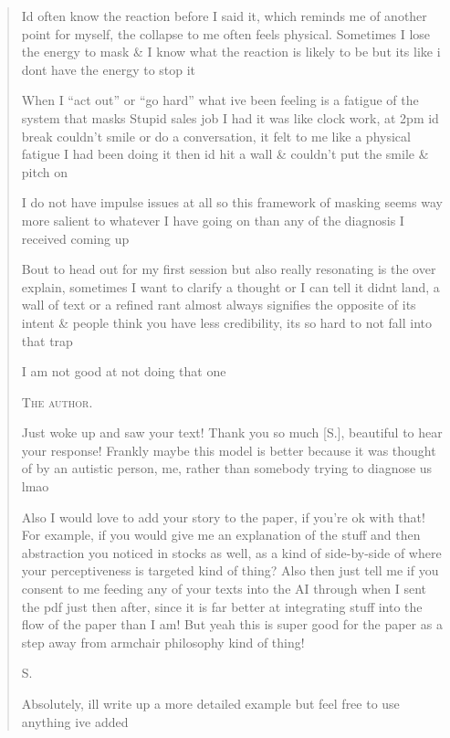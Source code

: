 \begin{quote}
\par\smallskip\noindent Id often know the reaction before I said it, which reminds me of another point for myself, the collapse to me often feels physical. Sometimes I lose the energy to mask \& I know what the reaction is likely to be but its like i dont have the energy to stop it
\par\smallskip\noindent When I ``act out'' or ``go hard'' what ive been feeling is a fatigue of the system that masks Stupid sales job I had it was like clock work, at 2pm id break couldn't smile or do a conversation, it felt to me like a physical fatigue I had been doing it then id hit a wall \& couldn't put the smile \& pitch on
\par\smallskip\noindent I do not have impulse issues at all so this framework of masking seems way more salient to whatever I have going on than any of the diagnosis I received coming up
\par\smallskip\noindent Bout to head out for my first session but also really resonating is the over explain, sometimes I want to clarify a thought or I can tell it didnt land, a wall of text or a refined rant almost always signifies the opposite of its intent \& people think you have less credibility, its so hard to not fall into that trap
\par\smallskip\noindent I am not good at not doing that one
\par\medskip\noindent\textsc{The author.}
\par\smallskip\noindent Just woke up and saw your text! Thank you so much [S.], beautiful to hear your response! Frankly maybe this model is better because it was thought of by an autistic person, me, rather than somebody trying to diagnose us lmao
\par\smallskip\noindent Also I would love to add your story to the paper, if you’re ok with that! For example, if you would give me an explanation of the stuff and then abstraction you noticed in stocks as well, as a kind of side-by-side of where your perceptiveness is targeted kind of thing? Also then just tell me if you consent to me feeding any of your texts into the AI through when I sent the pdf just then after, since it is far better at integrating stuff into the flow of the paper than I am! But yeah this is super good for the paper as a step away from armchair philosophy kind of thing!
\par\medskip\noindent\textsc{S.}
\par\smallskip\noindent Absolutely, ill write up a more detailed example but feel free to use anything ive added
\end{quote}

